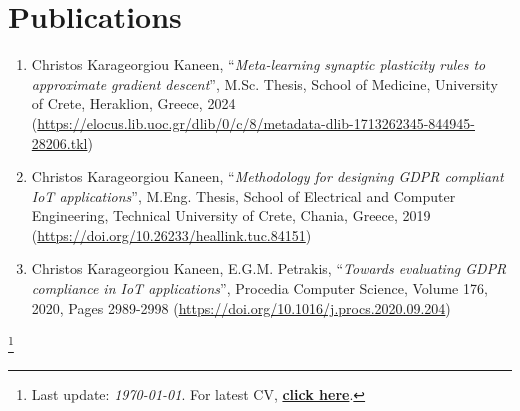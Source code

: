 \documentclass[letterpaper,11pt]{article}
\newcommand\blfootnote[1]{%
  \begingroup
  \renewcommand\thefootnote{}\footnote{#1}%
  \addtocounter{footnote}{-1}%
  \endgroup
}
\begin{document}
\section{Publications}
\begin{enumerate}
\item \label{NeuroscienceMScThesisMarker} Christos Karageorgiou Kaneen, ``\textit{Meta-learning synaptic plasticity rules to approximate gradient descent}'', M.Sc. Thesis, School of Medicine, University of Crete, Heraklion, Greece, 2024 (\url{https://elocus.lib.uoc.gr/dlib/0/c/8/metadata-dlib-1713262345-844945-28206.tkl})
\item Christos Karageorgiou Kaneen, ``\textit{Methodology for designing GDPR compliant IoT applications}'', M.Eng. Thesis, School of Electrical and Computer Engineering, Technical University of Crete, Chania, Greece, 2019 (\url{https://doi.org/10.26233/heallink.tuc.84151})
\item Christos Karageorgiou Kaneen, E.G.M. Petrakis, ``\textit{Towards evaluating GDPR compliance in IoT applications}'', Procedia Computer Science, Volume 176, 2020, Pages 2989-2998 (\url{https://doi.org/10.1016/j.procs.2020.09.204})
\end{enumerate}

\blfootnote{\large{Last update: \textit{\today}. For latest CV, \href{https://raw.githubusercontent.com/ckaraneen/cv/master/cv.pdf}{\textbf{click here}}.}}
\end{document}
